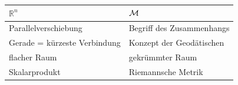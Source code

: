 \begin{figure}[H]
\centering
\begin{tabular}{>{\centering}p{} | >{\centering}p{}} 
$\mathbb{R}^n$ \vspace{5pt} & $\Huge\mathcal{M}$  \vspace{5pt} \tabularnewline \hline 
\vspace{5pt} Parallelverschiebung & \vspace{5pt} Begriff des Zusammenhangs\tabularnewline 
\vspace{5pt} Gerade = kürzeste Verbindung & \vspace{5pt} Konzept der Geodätischen \tabularnewline 
\vspace{5pt} flacher Raum & \vspace{5pt} gekrümmter Raum \tabularnewline 
\vspace{5pt} Skalarprodukt & \vspace{5pt} Riemannsche Metrik \tabularnewline 
\end{tabular}
\end{figure}
